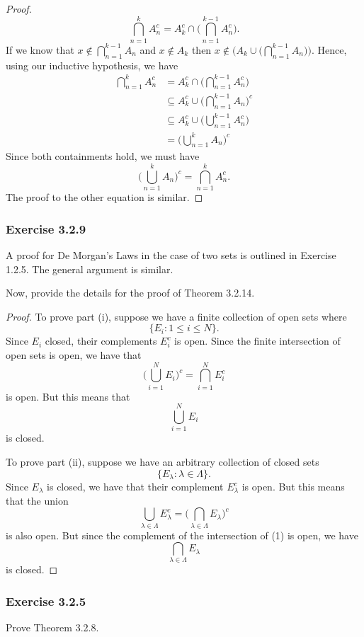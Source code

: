 \begin{proof}
\[ \bigcap_{ n=1 }^{ k } A_n^c = A_k^c \cap \Big( \bigcap_{ n=1 }^{ k-1 } A_{n}^c \Big).  \]
If we know that \( x \notin \bigcap_{ n=1 }^{ k-1 } A_{n} \) and \( x \notin A_k \) then \( x \notin \Big( A_k \cup \Big( \bigcap_{ n=1 }^{ k-1 } A_n \Big) \Big) \). Hence, using our inductive hypothesis, we have
\begin{align*}
    \bigcap_{ n=1 }^{ k } A_n^c &= A_k^c \cap \Big( \bigcap_{ n=1 }^{ k-1 } A_{n}^c \Big)  \\
                                &\subseteq A_k^c \cup \Big( \bigcap_{ n=1 }^{ k-1 } A_n \Big)^c \\ 
                                &\subseteq A_k^c \cup \Big( \bigcup_{ n=1 }^{ k-1 } A_n^c \Big) \\
                                &= \Big( \bigcup_{ n=1 }^{ k } A_n \Big)^c
\end{align*}
Since both containments hold, we must have 
\[ \Big( \bigcup_{ n=1 }^{ k }A_n  \Big)^c = \bigcap_{ n=1 }^{ k } A_n^c.  \]
The proof to the other equation is similar. 
\end{proof}





\subsubsection{Exercise 3.2.9}

A proof for De Morgan's Laws in the case of two sets is outlined in Exercise 1.2.5. The general argument is similar. 

Now, provide the details for the proof of Theorem 3.2.14. 
    \begin{proof}
    To prove part (i), suppose we have a finite collection of open sets where 
    \[ \{ E_{i} : 1 \leq  i \leq N \}.   \]
    Since \( E_i  \) closed, their complements \( E_i^c \) is open. Since the finite intersection of open sets is open, we have that 
    \[\Big(  \bigcup_{ i=1 }^{ N } E_{i} \Big)^c = \bigcap_{ i=1 }^{ N  } E_{i}^c  \]
    is open. But this means that 
    \[ \bigcup_{i=1}^{N} E_{i} \]
    is closed. 

    To prove part (ii), suppose we have an arbitrary collection of closed sets 
    \[ \{ E_\lambda : \lambda \in \Lambda \}.  \]
    Since \(E_{\lambda}\) is closed, we have that their complement \( E_{\lambda}^c \) is open. But this means that the union 
    \[ \bigcup_{\lambda \in \Lambda} E_{\lambda}^c = \Big( \bigcap_{ \lambda \in \Lambda } E_{\lambda}  \Big)^c \tag{1} \]
    is also open. But since the complement of the intersection of (1) is open, we have 
    \[ \bigcap_{ \lambda \in \Lambda } E_{\lambda}  \]
    is closed. 
    \end{proof}

\subsubsection{Exercise 3.2.5} Prove Theorem 3.2.8. 




